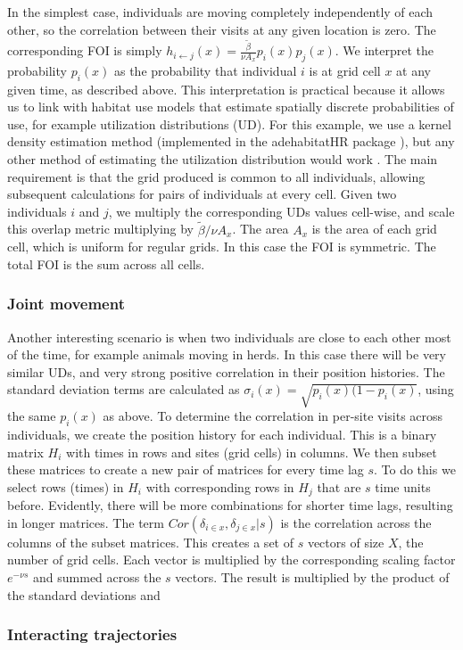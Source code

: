 \documentclass[letterpaper]{article}
\begin{document}
In the simplest case, individuals are moving completely independently of each other, so the correlation between their visits at any given location is zero. The corresponding FOI is simply $h_{i\leftarrow j}(x)=\frac{\tilde\beta}{\nu A_x} p_i(x)p_j(x)$. 
We interpret the probability $p_i(x)$ as the probability that individual $i$ is at grid cell $x$ at any given time, as described above. This interpretation is practical because it allows us to link  with habitat use models that estimate spatially discrete probabilities of use, for example utilization distributions (UD). For this example, we use a kernel density estimation method (implemented in the adehabitatHR package \cite{}), but any other method of estimating the utilization distribution would work \citep[e.g.][]{Kranstauber2012,Signer2017}. The main requirement is that the grid produced is common to all individuals, allowing subsequent calculations for pairs of individuals at every cell. %
Given two individuals $i$ and $j$, we multiply the corresponding UDs values cell-wise, and scale this overlap metric multiplying by $\tilde\beta/\nu A_x$. The area $A_x$ is the area of each grid cell, which is uniform for regular grids. In this case the FOI is symmetric. The total FOI is the sum across all cells.

\subsubsection{Joint movement}

Another interesting scenario is when two individuals are close to each other most of the time, for example animals moving in herds. In this case there will be very similar UDs, and very strong positive correlation in their position histories. 
The standard deviation terms are calculated as $\sigma_i(x)=\sqrt{p_i(x)(1-p_i(x)}$, using the same $p_i(x)$ as above. %
To determine the correlation in per-site visits across individuals, we create the position history for each individual. This is a binary matrix $H_i$ with times in rows and sites (grid cells) in columns. We then subset these matrices to create a new pair of matrices for every time lag $s$. To do this we select rows (times) in $H_i$ with corresponding rows in $H_j$ that are $s$ time units before. Evidently, there will be more combinations for shorter time lags, resulting in longer matrices. The term $Cor(\delta_{i \in x}, \delta_{j \in x} | s)$ is the correlation across the columns of the subset matrices. This creates a set of $s$ vectors of size $X$, the number of grid cells. Each vector is multiplied by the corresponding scaling factor $e^{-\nu s}$ and summed across the $s$ vectors. The result is multiplied by the product of the standard deviations and 

\subsubsection{Interacting trajectories}
 



\end{document}
